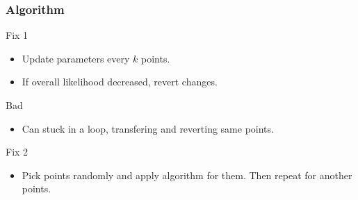 \documentclass{beamer}
\begin{document}
    \begin{frame}
        \frametitle{Algorithm}
        \begin{block}{Fix 1}
            \begin{itemize}
                \item Update parameters every $k$ points.
                \item If overall likelihood decreased, revert changes.
            \end{itemize}
        \end{block}

        \begin{block}{Bad}
            \begin{itemize}
                \item Can stuck in a loop, transfering and reverting same points.
            \end{itemize}
        \end{block}

        \begin{block}{Fix 2}
            \begin{itemize}
                \item Pick points randomly and apply algorithm for them. Then repeat for another points.
            \end{itemize}
        \end{block}

    \end{frame}
\end{document}

